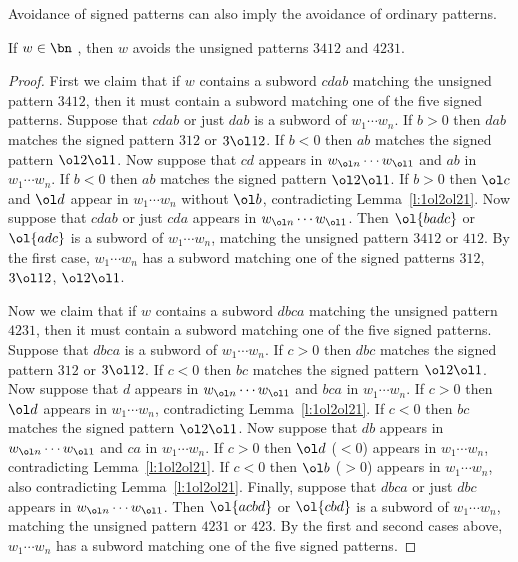 Avoidance of signed patterns can also imply the avoidance of ordinary patterns.
\begin{lem}\label{l:5signedp}
  If $w \in \bn$ \avoidssignedp, then $w$ avoids the unsigned patterns
  $3412$ and $4231$.
\end{lem}
\begin{proof}
  First we claim that if $w$ contains a subword $cdab$
  matching the unsigned pattern $3412$, then it must contain a subword
  matching one of the five signed patterns.
  Suppose that $cdab$ or just $dab$ is a subword of $w_1 \cdots w_n$.
  If $b>0$ then $dab$ matches the signed pattern $312$ or $3\ol12$.
  If $b<0$ then $ab$ matches the signed pattern $\ol2\ol1$.
  Now suppose that $cd$ appears in $w_{\ol n} \cdots w_{\ol1}$
  and $ab$ in $w_1 \cdots w_n$.
  If $b<0$ then $ab$ matches the signed pattern $\ol2\ol1$.
  If $b>0$ then $\ol c$ and $\ol d$ appear in $w_1 \cdots w_n$ without $\ol b$,
  contradicting Lemma~\ref{l:1ol2ol21}.
  Now suppose that $cdab$ or just $cda$
  appears in $w_{\ol n} \cdots w_{\ol 1}$.
  Then $\ol{badc}$ or $\ol{adc}$
  is a subword of $w_1 \cdots w_n$, matching the unsigned pattern
  $3412$ or $412$.  By the first case, $w_1 \cdots w_n$
  has a subword matching one of the signed patterns
  $312$, $3 \ol1 2$, $\ol2\ol1$.

  Now we claim that if $w$ contains a subword $dbca$
  matching the unsigned pattern $4231$, then it must contain a subword
  matching one of the five signed patterns.
  Suppose that $dbca$ is a subword of $w_1 \cdots w_n$.
  If $c > 0$ then $dbc$ matches the signed pattern $312$ or $3\ol12$.
  If $c < 0$ then $bc$ matches the signed pattern $\ol2\ol1$.
  Now suppose that $d$ appears in $w_{\ol n} \cdots w_{\ol 1}$
  and $bca$ in $w_1 \cdots w_n$.  If $c > 0$ then $\ol d$
  appears in $w_1 \cdots w_n$, contradicting Lemma~\ref{l:1ol2ol21}.
  If $c < 0$ then $bc$ matches the signed pattern $\ol2\ol1$.
  Now suppose that $db$ appears in $w_{\ol n} \cdots w_{\ol 1}$
  and $ca$ in $w_1 \cdots w_n$.
  If $c > 0$ then $\ol d$ ($<0$) appears in $w_1 \cdots w_n$,
  contradicting Lemma~\ref{l:1ol2ol21}.
  If $c < 0$ then $\ol b$ ($>0$) appears in $w_1 \cdots w_n$,
  also contradicting Lemma~\ref{l:1ol2ol21}.
  Finally, suppose that $dbca$ or just $dbc$
  appears in $w_{\ol n} \cdots w_{\ol 1}$.
  Then $\ol{acbd}$ or $\ol{cbd}$
  is a subword of $w_1 \cdots w_n$, matching the unsigned pattern
  $4231$ or $423$.  By the first and second cases above, $w_1 \cdots w_n$
  has a subword matching one of the five signed patterns.
\end{proof}

